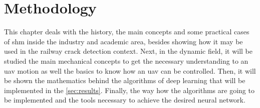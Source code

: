 \chapter{Methodology}\label{sec:methodology}

This chapter deals with the history, the main concepts and some practical cases of \gls*{shm} inside the industry and academic area, besides showing how it may be used in the railway crack detection context.
Next, in the dynamic field, it will be studied the main mechanical concepts to get the necessary understanding to an \gls*{uav} motion as well the basics to know how an \gls*{uav} can be controlled.
Then, it will be shown the mathematics behind the algorithms of deep learning that will be implemented in the \cref{sec:results}. 
Finally, the way how the algorithms are going to be implemented and the tools necessary to achieve the desired neural network.